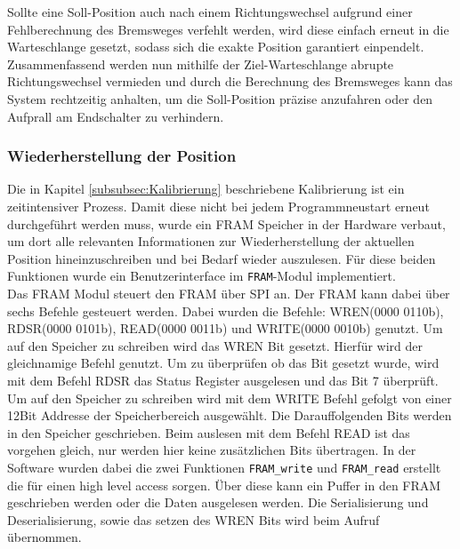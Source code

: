 \noindent
Sollte eine Soll-Position auch nach einem Richtungswechsel aufgrund einer Fehlberechnung des Bremsweges verfehlt werden, wird diese einfach erneut in die Warteschlange gesetzt, sodass sich die exakte Position garantiert einpendelt. Zusammenfassend werden nun mithilfe der Ziel-Warteschlange abrupte Richtungswechsel vermieden und durch die Berechnung des Bremsweges kann das System rechtzeitig anhalten, um die Soll-Position präzise anzufahren oder den Aufprall am Endschalter zu verhindern.
\subsubsection{Wiederherstellung der Position}
Die in Kapitel \ref{subsubsec:Kalibrierung} beschriebene Kalibrierung ist ein zeitintensiver Prozess. Damit diese nicht bei jedem Programmneustart erneut durchgeführt werden muss, wurde ein FRAM Speicher in der Hardware verbaut, um dort alle relevanten Informationen zur Wiederherstellung der aktuellen Position hineinzuschreiben und bei Bedarf wieder auszulesen. Für diese beiden Funktionen wurde ein Benutzerinterface im \verb|FRAM|-Modul implementiert.\\

\noindent
Das \ac{FRAM} Modul steuert den \ac{FRAM} über \ac{SPI} an. Der FRAM kann dabei über sechs Befehle gesteuert werden. Dabei wurden die Befehle: WREN(0000 0110b), RDSR(0000 0101b), READ(0000 0011b) und WRITE(0000 0010b) genutzt. Um auf den Speicher zu schreiben wird das \ac{WREN} Bit gesetzt. Hierfür wird der gleichnamige Befehl genutzt. Um zu überprüfen ob das Bit gesetzt wurde, wird mit dem Befehl RDSR das Status Register ausgelesen und das Bit 7 überprüft. Um auf den Speicher zu schreiben wird mit dem WRITE Befehl gefolgt von einer 12Bit Addresse der Speicherbereich ausgewählt. Die Darauffolgenden Bits werden in den Speicher geschrieben. Beim auslesen mit dem Befehl READ ist das vorgehen gleich, nur werden hier keine zusätzlichen Bits übertragen. In der Software wurden dabei die zwei Funktionen \verb|FRAM_write| und \verb|FRAM_read| erstellt die für einen high level access sorgen. Über diese kann ein Puffer in den \ac{FRAM} geschrieben werden oder die Daten ausgelesen werden. Die Serialisierung und Deserialisierung, sowie das setzen des \ac{WREN} Bits wird beim Aufruf übernommen.\\


